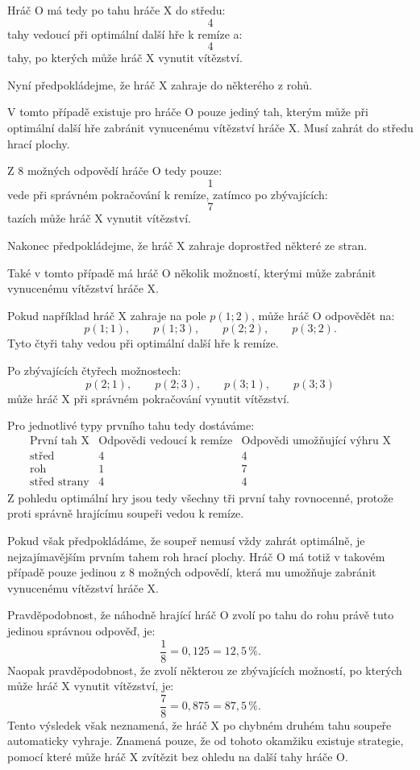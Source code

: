\documentclass[12pt,a4paper]{article}
\begin{document}
Hráč $\mathrm{O}$ má tedy po tahu hráče $\mathrm{X}$ do středu:
\[
    4
\]
tahy vedoucí při optimální další hře k remíze a:
\[
    4
\]
tahy, po kterých může hráč $\mathrm{X}$ vynutit vítězství.

Nyní předpokládejme, že hráč $\mathrm{X}$ zahraje do některého z rohů.

V tomto případě existuje pro hráče $\mathrm{O}$ pouze jediný tah, 
kterým může při optimální další hře zabránit vynucenému vítězství hráče $\mathrm{X}$. 
Musí zahrát do středu hrací plochy.

Z 8 možných odpovědí hráče $\mathrm{O}$ tedy pouze:
\[
    1
\]
vede při správném pokračování k remíze, zatímco po zbývajících:
\[
    7
\]
tazích může hráč $\mathrm{X}$ vynutit vítězství.

Nakonec předpokládejme, že hráč $\mathrm{X}$ zahraje doprostřed některé ze stran.

Také v tomto případě má hráč $\mathrm{O}$ několik možností, 
kterými může zabránit vynucenému vítězství hráče $\mathrm{X}$.

Pokud například hráč $\mathrm{X}$ zahraje na pole $p(1;2)$,
může hráč $\mathrm{O}$ odpovědět na:
\[
    p(1;1),\qquad p(1;3),\qquad p(2;2),\qquad p(3;2).
\]
Tyto čtyři tahy vedou při optimální další hře k remíze.

Po zbývajících čtyřech možnostech:
\[
    p(2;1),\qquad p(2;3),\qquad p(3;1),\qquad p(3;3)
\]
může hráč $\mathrm{X}$ při správném pokračování vynutit vítězství.

Pro jednotlivé typy prvního tahu tedy dostáváme:
\[
\begin{array}{c|c|c}
    \text{První tah } \mathrm{X} & \text{Odpovědi vedoucí k remíze} & \text{Odpovědi umožňující výhru } \mathrm{X} \\
    \hline
    \text{střed} & 4 & 4 \\
    \text{roh} & 1 & 7 \\
    \text{střed strany} & 4 & 4
\end{array}
\]
Z pohledu optimální hry jsou tedy všechny tři první tahy rovnocenné, 
protože proti správně hrajícímu soupeři vedou k remíze.

Pokud však předpokládáme, že soupeř nemusí vždy zahrát optimálně,
je nejzajímavějším prvním tahem roh hrací plochy. 
Hráč $\mathrm{O}$ má totiž v takovém případě pouze jedinou z 8 možných odpovědí, 
která mu umožňuje zabránit vynucenému vítězství hráče $\mathrm{X}$.

Pravděpodobnost, že náhodně hrající hráč $\mathrm{O}$ zvolí po tahu do rohu 
právě tuto jedinou správnou odpověď, je:
\[
    \frac{1}{8}=0{,}125=12{,}5\,\%.
\]
Naopak pravděpodobnost, že zvolí některou ze zbývajících možností, 
po kterých může hráč $\mathrm{X}$ vynutit vítězství, je:
\[
    \frac{7}{8}=0{,}875=87{,}5\,\%.
\]
Tento výsledek však neznamená, 
že hráč $\mathrm{X}$ po chybném druhém tahu soupeře automaticky vyhraje. 
Znamená pouze, že od tohoto okamžiku existuje strategie, 
pomocí které může hráč $\mathrm{X}$ zvítězit bez ohledu na další tahy hráče $\mathrm{O}$.
\end{document}

